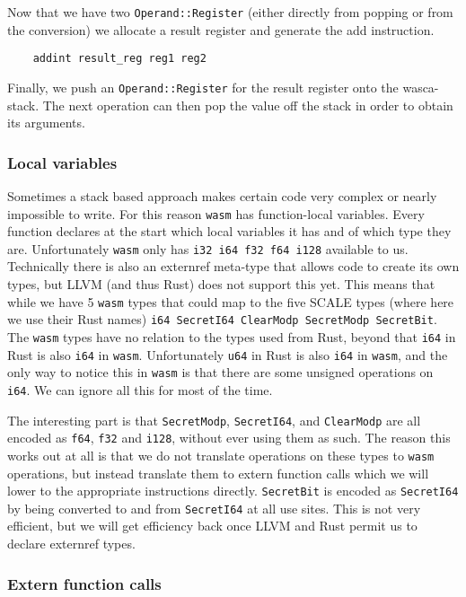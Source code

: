 Now that we have two \verb|Operand::Register| (either directly from popping or from the conversion)
we allocate a result register and generate the add instruction.
\begin{lstlisting}
    addint result_reg reg1 reg2
\end{lstlisting}
Finally, we push an \verb|Operand::Register| for the result register onto the wasca-stack.
The next operation can then pop the value off the stack in order to obtain its arguments.


\subsubsection{Local variables}

Sometimes a stack based approach makes certain code very complex or nearly impossible to write.
For this reason \verb|wasm| has function-local variables.
Every function declares at the start which local variables it has and of which type they are. Unfortunately \verb|wasm| only has
\verb|i32 i64 f32 f64 i128| available to us.
Technically there is also an externref meta-type that allows code to create
its own types, but LLVM (and thus Rust) does not support this yet.
This means that while we have 5 \verb|wasm| types that could map to the five SCALE types (where here we use their Rust names)
\verb|i64 SecretI64 ClearModp SecretModp SecretBit|.
The \verb|wasm| types have no relation to the types used from Rust, beyond that \verb|i64| in Rust is also
\verb|i64| in \verb|wasm|. Unfortunately \verb|u64| in Rust is also \verb|i64| in \verb|wasm|, and the only way
to notice this in \verb|wasm| is that there are some unsigned operations on \verb|i64|. We can ignore all this for most of the time.

The interesting part is that \verb|SecretModp|, \verb|SecretI64|, and \verb|ClearModp| are all encoded as
\verb|f64|, \verb|f32| and \verb|i128|, without ever using them as such.
The reason this works out at all is that we do not translate operations on these types to \verb|wasm| operations,
but instead translate them to extern function calls which we will lower to the appropriate instructions directly.
\verb|SecretBit| is encoded as \verb|SecretI64| by being converted to and from \verb|SecretI64| at all use sites.
This is not very efficient, but we will get efficiency back once LLVM and Rust permit us to declare externref types.

\subsubsection{Extern function calls}

